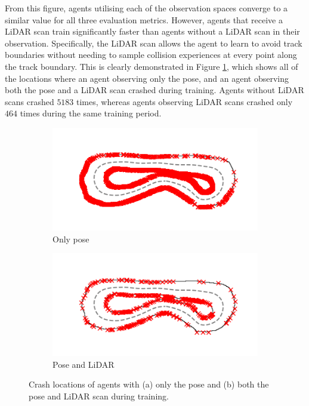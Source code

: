 From this figure, agents utilising each of the observation spaces converge to a similar value for all three evaluation metrics.
However, agents that receive a LiDAR scan train significantly faster than agents without a LiDAR scan in their observation.
Specifically, the LiDAR scan allows the agent to learn to avoid track boundaries without needing to sample collision experiences at every point along the track boundary.
This is clearly demonstrated in Figure \ref{fig:collision_distribution}, which shows all of the locations where an agent observing only the pose, and an agent observing both the pose and a LiDAR scan crashed during training.
Agents without LiDAR scans crashed $5183$ times, whereas agents observing LiDAR scans crashed only $464$ times during the same training period.

\begin{figure}[htb!]
    \centering
    \begin{subfigure}[htb!]{0.45\textwidth}
        \centering
        \includegraphics[height=.56\linewidth]{contents/chapt5/figs/observation/collision_distributions/crash_location_pose.png}
        \caption{Only pose}
    \end{subfigure}
    \hfill
    \begin{subfigure}[htb!]{0.45\textwidth}
        \centering
        \includegraphics[height=.56\linewidth]{contents/chapt5/figs/observation/collision_distributions/crash_location_both.png}
        \caption{Pose and LiDAR}
    \end{subfigure}
    \hfill
\caption[Locations of crashes during training]{Crash locations of agents with (a) only the pose and (b) both the pose and LiDAR scan during training.}
\label{fig:collision_distribution}
\end{figure}

